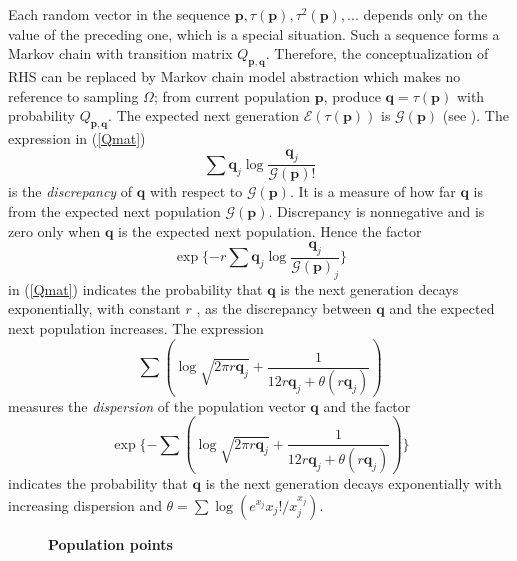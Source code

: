 Each random vector in the sequence $\bm{p}, \tau(\bm{p}), \tau^2(\bm{p}),...$ depends only on the value of the preceding one, 
which is a special situation. Such a sequence forms a Markov chain with transition matrix $Q_{\bm{p},\bm{q}}$. Therefore, 
the conceptualization of RHS can be replaced by Markov chain model abstraction which makes no reference to sampling $\Omega$; 
from current population $\bm{p}$, produce $\bm{q} = \tau (\bm{p})$ with probability $Q_{\bm{p},\bm{q}}$. The expected next generation 
$\mathcal{E}(\tau (\bm{p}))$ is $\mathcal{G}(\bm{p})$ (see \cite{Vose1999}). The expression in (\ref{Qmat})
\[
\sum \bm{q}_j \log \frac{\bm{q}_j}{\mathcal{G}(\bm{p})!}
\]
is the {\em discrepancy} of $\bm{q}$ with respect to $\mathcal{G}(\bm{p})$. It is a measure of how far $\bm{q}$ is from the expected next population 
$\mathcal{G}(\bm{p})$. Discrepancy is nonnegative and is zero only when $\bm{q}$ is the expected next population. Hence the factor 
\[
\exp\{-r \sum \bm{q}_j \log \frac{\bm{q}_j}{\mathcal{G}(\bm{p})_j}\}
\]
in (\ref{Qmat}) indicates the probability that $\bm{q}$ is the next generation
decays exponentially, with constant $r$ , as the discrepancy between $\bm{q}$ and the
expected next population increases.
The expression 
\[
\sum (\log \sqrt{2 \pi r\bm{q}_j} + \frac{1}{12r\bm{q}_j + \theta (r\bm{q}_j)})
\]
measures the {\em dispersion} of the population vector $\bm{q}$ and the factor
\[
\exp\{- \sum (\log \sqrt{2 \pi r\bm{q}_j} + \frac{1}{12r\bm{q}_j + \theta (r\bm{q}_j)})\}
\]
indicates the probability that $\bm{q}$ is the next generation decays exponentially with increasing dispersion and 
$\theta  =  \sum \log(e^{x_j}x_j!/x_j^{x_j})$.

\begin{figure}[H]
\begin{center}
\hspace{4pt}
\caption{\textbf{Population points} }
\label{tetra_popn}
\end{center}
\end{figure}

